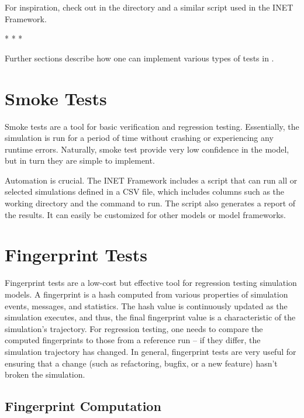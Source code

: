 For inspiration, check out  in the 
directory and a similar script used in the INET Framework.

\bigskip
\begin{center}
* * *
\end{center}
\bigskip

Further sections describe how one can implement various types of tests in
{\opp}.

\section{Smoke Tests}
\label{sec:testing:smoke-tests}

Smoke tests are a tool for basic verification and regression testing.
Essentially, the simulation is run for a period of time without crashing or
experiencing any runtime errors. Naturally, smoke test provide very low confidence in
the model, but in turn they are simple to implement.

Automation is crucial. The INET Framework includes a script that can run all or
selected simulations defined in a CSV file, which includes columns such as the
working directory and the command to run. The script also generates a report of
the results. It can easily be customized for other models or model frameworks.


\section{Fingerprint Tests}
\label{sec:testing:fingerprint-tests}

Fingerprint tests are a low-cost but effective tool for regression testing
simulation models. A fingerprint is a hash computed from various properties
of simulation events, messages, and statistics. The hash value is continuously
updated as the simulation executes, and thus, the final fingerprint value is
a characteristic of the simulation's trajectory. For regression testing, one
needs to compare the computed fingerprints to those from a reference run --
if they differ, the simulation trajectory has changed. In general, fingerprint
tests are very useful for ensuring that a change (such as refactoring, bugfix,
or a new feature) hasn't broken the simulation.

\subsection{Fingerprint Computation}
\label{sec:testing:fingerprint-computation}

